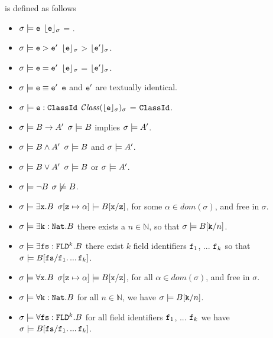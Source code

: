  \begin{definition} is defined  as follows
\label{def:valid"basic:assert}
\begin{itemize}
\item
$\sigma \models {\mbox{\tt{e}}}$ \IFF  ${\lfloor{ {\ensuremath{{\mbox{\tt{e}}}}}}\rfloor_{\sigma}}$ = .
\item
$\sigma \models {\mbox{\tt{e}}}>{\mbox{\tt{e}}}'$ \IFF ${\lfloor{ {\ensuremath{{\mbox{\tt{e}}}}}}\rfloor_{\sigma}}$ > ${\lfloor{ {\ensuremath{{\mbox{\tt{e}}}'}}}\rfloor_{\sigma}}$.
\item
$\sigma \models {\mbox{\tt{e}}}={\mbox{\tt{e}}}'$ \IFF ${\lfloor{ {\ensuremath{{\mbox{\tt{e}}}}}}\rfloor_{\sigma}}$ = ${\lfloor{ {\ensuremath{{\mbox{\tt{e}}}'}}}\rfloor_{\sigma}}$.
\item
$\sigma \models {\mbox{\tt{e}}}\equiv{\mbox{\tt{e}}}'$ \IFF ${\mbox{\tt{e}}}$ and ${\mbox{\tt{e}}}'$ are textually identical.
\item
$\sigma \models  {\mbox{\tt{e}}}:{\mbox{\tt{ClassId}}}$ \IFF ${\mathcal C}{\mathit{lass}}({\lfloor{ {\ensuremath{{\mbox{\tt{e}}}}}}\rfloor_{\sigma}})_{\sigma}$ = ${\mbox{\tt{ClassId}}}$.
\item
$\sigma \models B \rightarrow A' $ \IFF $\sigma \models B$ implies $\sigma \models A'$. 
\item
$\sigma \models B \wedge A' $ \IFF $\sigma \models B$ and $\sigma \models A'$. 
\item
$\sigma \models B \vee A' $ \IFF $\sigma \models B$ or $\sigma \models A'$. 
\item
$\sigma \models\neg  B $ \IFF $\sigma \not\models B$. 
\item
$\sigma \models  \exists {\mbox{\tt{x}}}.B$ \IFF $\sigma[{\mbox{\tt{z}}}\mapsto \alpha] \models  B[{\mbox{\tt{x}}}/{\mbox{\tt{z}}}]$, for some $\alpha\in dom(\sigma)$,  and   free in $\sigma$.
\item
$\sigma \models  \exists {\mbox{\tt{k}}}:{\mbox{\tt{Nat}}}.B$ \IFF  there exists a $n\in\mathbb{N}$, so that   $\sigma \models    B[{\mbox{\tt{k}}}/n]$. 
\item
$\sigma \models  \exists {\mbox{\tt{fs}}}:{\mbox{\tt{FLD}}}^k.B$ \IFF  there exist $k$ field identifiers ${\mbox{\tt{f}}}_1$, ... ${\mbox{\tt{f}}}_k$ so that 
$\sigma \models  B[{\mbox{\tt{fs}}}/{\mbox{\tt{f}}}_1.\,...\,{\mbox{\tt{f}}}_k]$. 
\item
$\sigma \models  \forall {\mbox{\tt{x}}}.B$ \IFF $\sigma[{\mbox{\tt{z}}}\mapsto \alpha] \models  B[{\mbox{\tt{x}}}/{\mbox{\tt{z}}}]$, for all $\alpha\in dom(\sigma)$,  and   free in $\sigma$.
\item
$\sigma \models  \forall {\mbox{\tt{k}}}:{\mbox{\tt{Nat}}}.B$ \IFF for all $n\in\mathbb{N}$, we have   $\sigma \models    B[{\mbox{\tt{k}}}/n]$. 
\item
$\sigma \models  \forall {\mbox{\tt{fs}}}:{\mbox{\tt{FLD}}}^k.B$ \IFF  for all   field identifiers ${\mbox{\tt{f}}}_1$, ... ${\mbox{\tt{f}}}_k$ we have
$\sigma \models  B[{\mbox{\tt{fs}}}/{\mbox{\tt{f}}}_1.\,...\,{\mbox{\tt{f}}}_k]$. 
\end{itemize}
\end{definition}

